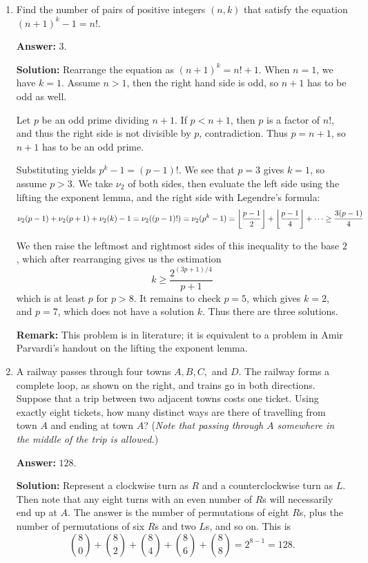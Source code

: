 \documentclass[11pt,paper=letter]{scrartcl}
\begin{document}
\begin{enumerate}[left=0pt]
\item Find the number of pairs of positive integers $(n, k)$ that satisfy the equation $(n + 1)^k - 1 = n!$.

\textbf{Answer:} $\boxed{3}$.

\textbf{Solution:} Rearrange the equation as $(n+1)^k = n! + 1$. When $n = 1$, we have $k = 1$. Assume $n > 1$, then the right hand side is odd, so $n + 1$ has to be odd as well.

Let $p$ be an odd prime dividing $n+1$. If $p < n + 1$, then $p$ is a factor of $n!$, and thus the right side is not divisible by $p$, contradiction. Thus $p = n + 1$, so $n + 1$ has to be an odd prime.

Substituting yields $p^k - 1 = (p - 1)!$. We see that $p = 3$ gives $k = 1$, so assume $p > 3$. We take $\nu_2$ of both sides, then evaluate the left side using the lifting the exponent lemma, and the right side with Legendre's formula: $$\nu_2(p - 1) + \nu_2(p + 1) + \nu_2(k) - 1 = \nu_2((p-1)!) = \nu_2(p^k - 1) = \left\lfloor \frac{p-1}{2} \right\rfloor + \left\lfloor \frac{p-1}{4} \right\rfloor + \cdots \geq \frac{3(p - 1)}{4}$$

We then raise the leftmost and rightmost sides of this inequality to the base $2$, which after rearranging gives us the estimation $$k \geq \frac{2^{(3p + 1)/4}}{p + 1}$$ which is at least $p$ for $p > 8$. It remains to check $p = 5$, which gives $k = 2$, and $p = 7$, which does not have a solution $k$. Thus there are three solutions.

\textbf{Remark:} This problem is in literature; it is equivalent to a problem in Amir Parvardi's handout on the lifting the exponent lemma.

\item A railway passes through four towns $A, B, C,$ and $D$. The railway forms a complete loop, as shown on the right, and trains go in both directions. Suppose that a trip between two adjacent towns costs one ticket. Using exactly eight tickets, how many distinct ways are there of travelling from town $A$ and ending at town $A$? (\emph{Note that passing through $A$ somewhere in the middle of the trip is allowed.})

\textbf{Answer:} $\boxed{128}$.

\textbf{Solution:} Represent a clockwise turn as $R$ and a counterclockwise turn as $L$. Then note that any eight turns with an even number of $R$s will necessarily end up at $A$. The answer is the number of permutations of eight $R$s, plus the number of permutations of six $R$s and two $L$s, and so on. This is $$\binom{8}{0} + \binom{8}{2} + \binom{8}{4} + \binom{8}{6} + \binom{8}{8} = 2^{8 - 1} = 128.$$


\end{enumerate}
\end{document}
